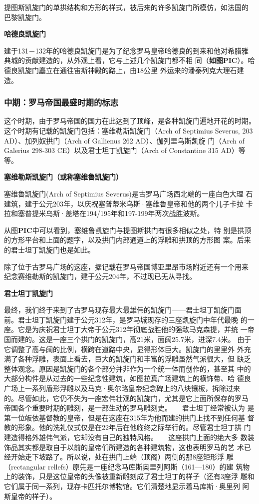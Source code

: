 \documentclass[a4paper,dvipdfm]{article}
\begin{document}
提图斯凯旋门的单拱结构和方形的样式，被后来的许多凯旋门所模仿，如法国的
巴黎凯旋门。

\textbf{哈德良凯旋门}

建于131－132年的哈德良凯旋门是为了纪念罗马皇帝哈德良的到来和他对希腊雅
典城的贡献建造的，从外观上看，它与上述几个凯旋门都不相
同（\textbf{如图PIC}）。哈德良凯旋门矗立在通往宙斯神殿的路上，由18公里
外运来的潘泰列克大理石建造。


\subsubsection{中期：罗马帝国最盛时期的标志}

这个时期，由于罗马帝国的国力在此达到了顶峰，是各种凯旋门遍地开花的时期。
这个时期有记载的凯旋门包括：塞维勒斯凯旋门（Arch of Septimius Severus,
203 AD）、加列奴拱门（Arch of Gallienus 262 AD）、伽列里乌斯凯旋
门（Arch of Galerius 298-303 CE）以及君士坦丁凯旋门（Arch of
Constantine 315 AD）等等。

\textbf{塞维勒斯凯旋门（或称塞维鲁凯旋门）}

塞维鲁凯旋门(Arch of Septimius Severus)是古罗马广场西北端的一座白色大理
石建筑，建于公元203年，以庆祝塞普蒂米乌斯·塞维鲁皇帝和他的两个儿子卡拉
卡拉和塞普提米乌斯·盖塔在194/195年和197-199年两次战胜波斯。

从图\textbf{PIC}中可以看到，塞维鲁凯旋门与提图斯拱门有很多相似之处，特
别是拱顶的方形平台和上面的题字，以及拱门内部通道上的浮雕和拱顶的方形图
案。后来的君士坦丁凯旋门也是如此。

除了位于古罗马广场的这座，据记载在罗马帝国博亚里昂市场附近还有一个用来
纪念赛维勒斯的凯旋门，建于公元204年，不过现已无从寻找。


\textbf{君士坦丁凯旋门}

最终，我们终于来到了古罗马现存最大最雄伟的凯旋门——君士坦丁凯旋门面
前。君士坦丁凯旋门建于公元312年，是罗马城现存的三座凯旋门中年代最晚
的一座。它是为庆祝君士坦丁大帝于公元312年彻底战胜他的强敌马克森提，并统
一帝国而建的。这是一座三个拱门的凯旋门，高21米，面阔25.7米，进深7.4米。
由于它调整了高与阔的比例，横跨在道路中央，显得形体巨大。凯旋门的里里外
外充满了各种浮雕，表面上看去，巨大的凯旋门和丰富的浮雕虽然气派很大，但
缺乏整体观念。原因是凯旋门的各个部分并非作为一个统一体而创作的，甚至其
中的大部分构件是从过去的一些纪念性建筑，如图拉真广场建筑上的横饰带、哈
德良广场上一系列盾形浮雕以及马克·奥尔略皇帝纪念碑上的八块镶板，拆除过来
的。尽管如此，它仍不失为一座宏伟壮观的凯旋门，尤其是它上面所保存的罗马
帝国各个重要时期的雕刻，是一部生动的罗马雕刻史。　　君士坦丁经常被认为
是第一位皈依基督教的皇帝，但是在这座在315年为他而建的拱门上找不到任何基
督教的形象。他的洗礼仪式仅是在22年后在他临终之际举行的。尽管君士坦丁拱
门建造得格外雄伟气派，它却没有自己的独特风格。　　这座拱门上面的绝大多
数装饰品其实都是取自于以前的皇帝们所建造的各种建筑物，这也表明罗马的艺
术已经开始走下坡路了。所以说，处在拱门上端（顶阁）两侧的那8座矩形浮
雕（rectangular rellefs）原先是一座纪念马库斯奥里列阿斯（161—180）的建
筑物上的装饰，只是这位皇帝的头像被重新雕刻成了君士坦丁的样子（还有3座浮
雕和它们属于同一系列，现存卡匹托尔博物馆。它们清楚地显示着马库斯·奥里列
阿斯皇帝的样子）。
\end{document}
